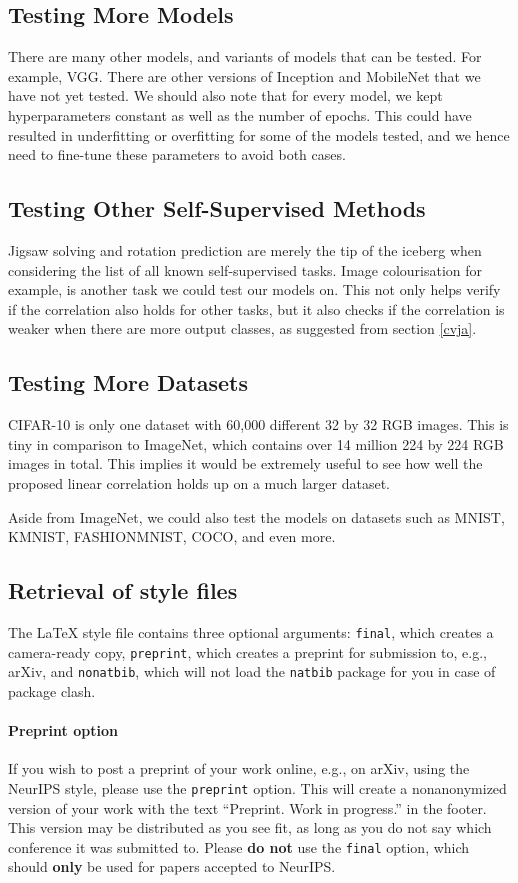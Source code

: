 \documentclass{article}
\begin{document}
\subsection{Testing More Models}
There are many other models, and variants of models that can be tested. For example, VGG. There are other versions of Inception and MobileNet that we have not yet tested. We should also note that for every model, we kept hyperparameters constant as well as the number of epochs. This could have resulted in underfitting or overfitting for some of the models tested, and we hence need to fine-tune these parameters to avoid both cases.

\subsection{Testing Other Self-Supervised Methods}
Jigsaw solving and rotation prediction are merely the tip of the iceberg when considering the list of all known self-supervised tasks. Image colourisation for example, is another task we could test our models on. This not only helps verify if the correlation also holds for other tasks, but it also checks if the correlation is weaker when there are more output classes, as suggested from section \ref{cvja}.

\subsection{Testing More Datasets}
CIFAR-10 is only one dataset with 60,000 different 32 by 32 RGB images. This is tiny in comparison to ImageNet, which contains over 14 million 224 by 224 RGB images in total. This implies it would be extremely useful to see how well the proposed linear correlation holds up on a much larger dataset. 

Aside from ImageNet, we could also test the models on datasets such as MNIST, KMNIST, FASHIONMNIST, COCO, and even more.

\subsection{Retrieval of style files}

The \LaTeX{} style file contains three optional arguments: \verb+final+, which
creates a camera-ready copy, \verb+preprint+, which creates a preprint for
submission to, e.g., arXiv, and \verb+nonatbib+, which will not load the
\verb+natbib+ package for you in case of package clash.


\paragraph{Preprint option}
If you wish to post a preprint of your work online, e.g., on arXiv, using the
NeurIPS style, please use the \verb+preprint+ option. This will create a
nonanonymized version of your work with the text ``Preprint. Work in progress.''
in the footer. This version may be distributed as you see fit, as long as you do not say which conference it was submitted to. Please \textbf{do
  not} use the \verb+final+ option, which should \textbf{only} be used for
papers accepted to NeurIPS. 
\end{document}
